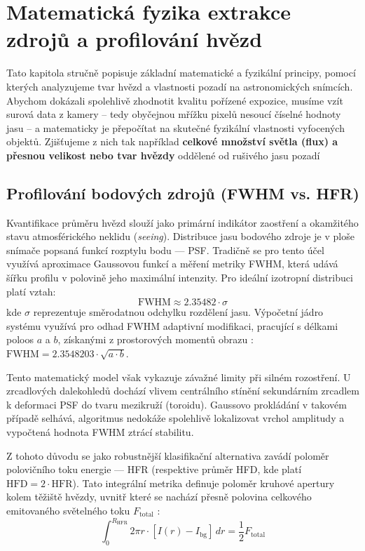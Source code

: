 \chapter{Matematická fyzika extrakce zdrojů a profilování hvězd}
\label{ch:math}

Tato kapitola stručně popisuje základní matematické a fyzikální principy, pomocí kterých analyzujeme tvar hvězd a vlastnosti pozadí na astronomických snímcích. Abychom dokázali spolehlivě zhodnotit kvalitu pořízené expozice, musíme vzít surová data z kamery – tedy obyčejnou mřížku pixelů nesoucí číselné hodnoty jasu – a matematicky je přepočítat na skutečné fyzikální vlastnosti vyfocených objektů. Zjišťujeme z nich tak například \textbf{celkové množství světla (flux) a přesnou velikost nebo tvar hvězdy} oddělené od rušivého jasu pozadí

\section{Profilování bodových zdrojů (FWHM vs. HFR)}
Kvantifikace průměru hvězd slouží jako primární indikátor zaostření a okamžitého stavu atmosférického neklidu (\textit{seeing}). Distribuce jasu bodového zdroje je v ploše snímače popsaná funkcí rozptylu bodu — \ac{PSF}. Tradičně se pro tento účel využívá aproximace Gaussovou funkcí a měření metriky \ac{FWHM}, která udává šířku profilu v polovině jeho maximální intenzity. Pro ideální izotropní distribuci platí vztah:
\begin{equation}
\text{FWHM} \approx 2.35482 \cdot \sigma
\end{equation}
kde $\sigma$ reprezentuje směrodatnou odchylku rozdělení jasu. Výpočetní jádro systému využívá pro odhad \ac{FWHM} adaptivní modifikaci, pracující s délkami poloos $a$ a $b$, získanými z prostorových momentů obrazu \cite{sextractor}: $\text{FWHM} = 2.3548203 \cdot \sqrt{a \cdot b}$.

Tento matematický model však vykazuje závažné limity při silném rozostření. U zrcadlových dalekohledů dochází vlivem centrálního stínění sekundárním zrcadlem k deformaci \ac{PSF} do tvaru mezikruží (toroidu). Gaussovo prokládání v takovém případě selhává, algoritmus nedokáže spolehlivě lokalizovat vrchol amplitudy a vypočtená hodnota \ac{FWHM} ztrácí stabilitu.

Z tohoto důvodu se jako robustnější klasifikační alternativa zavádí poloměr polovičního toku energie — \ac{HFR} (respektive průměr \ac{HFD}, kde platí $\text{HFD} = 2 \cdot \text{HFR}$). Tato integrální metrika definuje poloměr kruhové apertury kolem těžiště hvězdy, uvnitř které se nachází přesně polovina celkového emitovaného světelného toku $F_{\text{total}}$ \cite{hfr}:
\begin{equation}
\int_{0}^{R_{\text{HFR}}} 2\pi r \cdot [I(r) - I_{\text{bg}}] \, dr = \frac{1}{2} F_{\text{total}}
\end{equation}

